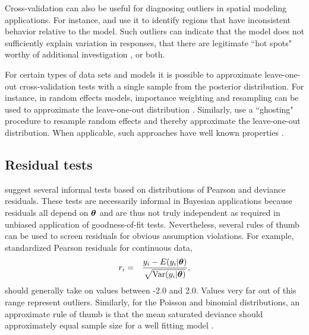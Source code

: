 \documentclass[12pt,english]{article}
\begin{document}
\begin{spacing}{1.9}
Cross-validation can also be useful for diagnosing outliers in spatial
modeling applications.  For instance, \citet{SternCressie2000} and
\citet{MarshallSpiegelhalter2003} use it to identify regions that have
inconsistent behavior relative to the model.  Such outliers can
indicate that the model does not sufficiently explain variation in
responses, that there are legitimate ``hot spots" worthy of additional
investigation \citep{MarshallSpiegelhalter2003}, or both.

For certain types of data sets and models it is possible to
approximate leave-one-out cross-validation tests with a single sample
from the posterior distribution.  For instance, in random effects
models, importance weighting and resampling can be used to approximate
the leave-one-out distribution
\citep{SternCressie2000,QiuEtAl2016}. Similarly,
\citet{MarshallSpiegelhalter2007} use a ``ghosting" procedure
to resample random effects and thereby approximate the leave-one-out
distribution.  When applicable, such approaches have well known properties \citep[i.e., a uniform distribution of
p-values under the null;][]{QiuEtAl2016}.

\subsection{Residual tests}

\citet{LunnEtAl2013} suggest several informal tests based on
distributions of Pearson and deviance residuals.  These tests are
necessarily informal in Bayesian applications because residuals all depend
on $\boldsymbol{\theta}$ and are thus not truly independent as required in
unbiased application of goodness-of-fit tests.  Nevertheless, several
rules of thumb can be used to screen residuals for obvious assumption
violations.  For example, standardized Pearson residuals for
continuous data,
\begin{eqnarray*}
  r_i & = & \frac{y_i - E(y_i|\boldsymbol{\theta})}{\sqrt{\textrm{Var}(y_i | \boldsymbol{\theta})}},
\end{eqnarray*}
should generally take on values between -2.0 and 2.0.  Values very far
out of this range represent outliers.  Similarly, for the Poisson and
binomial distributions, an approximate rule of thumb is that the mean
saturated deviance should approximately equal sample size for a well
fitting model \citep{LunnEtAl2013}.


\end{spacing}
\end{document}
